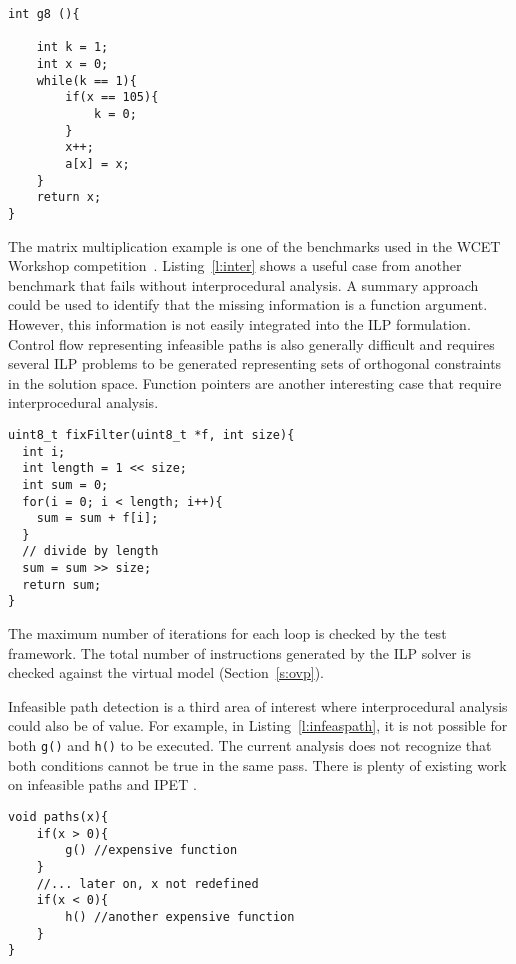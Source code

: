 \begin{lstlisting}[caption={Indirect test on induction variable fails.},label=l:fail]
int g8 (){

	int k = 1;
	int x = 0;
	while(k == 1){
		if(x == 105){
			k = 0;
		}
		x++;
		a[x] = x;
	}
	return x;
}
\end{lstlisting}

The matrix multiplication example is one of the benchmarks used in the WCET Workshop competition~\cite{wcetcomp}. Listing~\ref{l:inter} shows a useful case from another benchmark that fails without interprocedural analysis. A summary approach could be used to identify that the missing information is a function argument. However, this information is not easily integrated into the ILP formulation. Control flow representing infeasible paths is also generally difficult and requires several ILP problems to be generated representing sets of orthogonal constraints in the solution space. Function pointers are another interesting case that require interprocedural analysis.
\clearpage
\begin{lstlisting}[caption={Interprocedural analysis is necessary to analyze programs that call a function which takes the threshold as an argument.},label={l:inter}]
uint8_t fixFilter(uint8_t *f, int size){
  int i;
  int length = 1 << size;
  int sum = 0;
  for(i = 0; i < length; i++){
    sum = sum + f[i];	
  }   
  // divide by length
  sum = sum >> size;
  return sum;
}
\end{lstlisting}

The maximum number of iterations for each loop is checked by the test framework. The total number of instructions generated by the ILP solver is checked against the virtual model (Section~\ref{s:ovp}).

Infeasible path detection is a third area of interest where interprocedural analysis could also be of value. For example, in Listing~\ref{l:infeaspath}, it is not possible for both \texttt{g()} and \texttt{h()} to be executed. The current analysis does not recognize that both conditions cannot be true in the same pass. There is plenty of existing work on infeasible paths and IPET \cite{gustafsson2006automatic,suhendra2006efficient}.


\begin{lstlisting}[caption={Infeasible path analysis is required to further tighten the WCET estimates.},label={l:infeaspath}]
void paths(x){
	if(x > 0){
		g() //expensive function
	}
	//... later on, x not redefined
	if(x < 0){
		h() //another expensive function
	}
}
\end{lstlisting}


